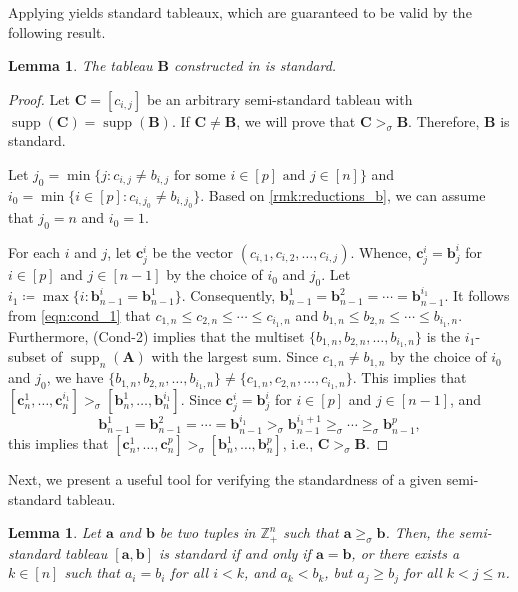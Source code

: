 \documentclass[11pt,a4paper,reqno,dvipsnames]{amsart}
\theoremstyle{plain}
\newtheorem{Lemma}[Theorem]{Lemma}
\theoremstyle{definition}
\newtheorem{Assumptions and Discussion}[Theorem]{Assumptions and Discussion}
\theoremstyle{remark}
\def\supp{\operatorname{supp}}
\def\ZZ{{\mathbb Z}}
\newcommand\bda{{\bm a}}
\newcommand\bdb{{\bm b}}
\newcommand\bdc{{\bm c}}
\newcommand\bfA{\mathbf{A}}
\newcommand\bfB{\mathbf{B}}
\newcommand\bfC{\mathbf{C}}
\begin{document}
Applying  yields standard tableaux, which are guaranteed to be valid by the following result. 

\begin{Lemma}
    \label{lem:algo_works}
    The tableau $\bfB$ constructed in  is standard.
\end{Lemma}

\begin{proof}
    Let $\bfC=[c_{i,j}]$ be an arbitrary semi-standard tableau with $\supp(\bfC)=\supp(\bfB)$. If $\bfC\ne \bfB$, we will prove that $\bfC>_{\sigma} \bfB$. Therefore, $\bfB$ is standard.

    Let $j_0=\min\{j: c_{i,j}\ne b_{i,j} \text{ for some $i\in [p]$ and $j\in [n]$}\}$ and $i_0=\min\{i\in [p]:c_{i,j_0}\ne b_{i,j_0}\}$.
    Based on \ref{rmk:reductions_b}, we can assume that $j_0=n$ and $i_0=1$.

    For each $i$ and $j$, let $\bdc^i_{j}$ be the vector $(c_{i,1},c_{i,2},\dots,c_{i,j})$. Whence, $\bdc^i_{j}=\bdb^i_{j}$ for $i\in [p]$ and $j\in [n-1]$ by the choice of $i_0$ and $j_0$. Let $i_1 \coloneqq \max\{i: \bdb^i_{n-1}=\bdb^1_{n-1}\}$. Consequently, $\bdb^1_{n-1}=\bdb^2_{n-1}=\cdots=\bdb^{i_1}_{n-1}$. 
It follows from \eqref{eqn:cond_1} that $c_{1,n}\le c_{2,n} \le \cdots \le c_{i_1,n}$ and  $b_{1,n}\le b_{2,n}\le \cdots \le b_{i_1,n}$.
Furthermore, (Cond-2) implies that the multiset $\{b_{1,n},b_{2,n},\dots,b_{i_1,n}\}$ is the $i_1$-subset of $\supp_{n}(\bfA)$ with the largest sum. Since $c_{1,n}\ne b_{1,n}$ by the choice of $i_0$ and $j_0$, we have $\{b_{1,n},b_{2,n},\dots,b_{i_1,n}\}\ne \{c_{1,n},c_{2,n},\dots,c_{i_1,n}\}$. This implies that $[\bdc^1_{n}, \ldots,\bdc^{i_1}_{n}] >_{\sigma} [\bdb^{1}_{n},\ldots,\bdb^{i_1}_{n}]$. Since $\bdc^{i}_{j}=\bdb^i_{j}$ for $i\in [p]$ and $j\in [n-1]$, and
    \[
        \bdb^1_{n-1}=\bdb^2_{n-1}=\cdots=\bdb^{i_1}_{n-1}>_{\sigma}\bdb^{i_1+1}_{n-1}\ge_{\sigma} \cdots \ge_{\sigma} \bdb^{p}_{n-1},
    \]
    this implies that $[\bdc^1_{n},\ldots,\bdc^{p}_{n}]>_{\sigma} [ \bdb^{1}_{n}, \ldots, \bdb_{n}^p]$, i.e., $\bfC>_{\sigma} \bfB$. 
\end{proof}

Next, we present a useful tool for verifying the 
standardness
of a given semi-standard tableau.

\begin{Lemma}
    \label{StandardProp}
    Let $\bda$ and $\bdb$ be two tuples in $\ZZ_+^{n}$ such that $\bda\ge_\sigma \bdb$. Then, the semi-standard tableau $[\bda,\bdb]$ is standard if and only if $\bda=\bdb$, or there exists a $k\in [n]$ such that $a_{i}=b_{i}$ for all $i<k$, and $a_k<b_{k}$, but $a_{j}\geq b_j$ for all $k<j\leq n$.
\end{Lemma}
\end{document}
